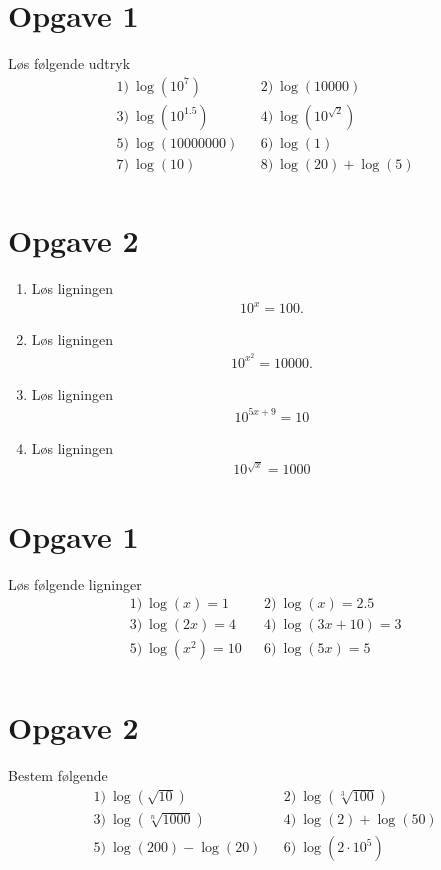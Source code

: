 \section*{Opgave 1}
Løs følgende udtryk
\begin{align*}
	&1) \ \log(10^7)    &&2) \ \log(10000)   \\  
	&3) \ \log(10^{1.5})   &&4) \ \log(10^{\sqrt{2}})     \\  
	&5) \ \log(10000000)   &&6) \ \log(1)   \\  
	&7) \  \log(10)  &&8) \ \log(20)+ \log(5)   \\   
\end{align*}

\section*{Opgave 2}
\begin{enumerate}[label=\roman*)]
	\item Løs ligningen
	\begin{align*}
		10^x = 100.
	\end{align*}
	\item Løs ligningen 
	\begin{align*}
		10^{x^2} = 10000.
	\end{align*}
	\item Løs ligningen 
	\begin{align*}
		10^{5x+9} = 10
	\end{align*}
	\item Løs ligningen 
	\begin{align*}
		10^{\sqrt{x}} = 1000
	\end{align*}
\end{enumerate}

\section*{Opgave 1}
Løs følgende ligninger
\begin{align*}
&1) \  \log(x) = 1  &&2) \ \log(x) = 2.5    \\
&3) \ \log(2x) = 4   &&4) \ \log(3x+10)=3    \\
&5) \ \log(x^2) = 10   &&6) \  \log(5x) = 5    \\
\end{align*}
\section*{Opgave 2}
Bestem følgende 
\begin{align*}
&1) \ \log(\sqrt{10})    &&2) \  \log(\sqrt[3]{100})  \\
&3) \ \log(\sqrt[n]{1000})   &&4) \ \log(2) + \log(50)    \\
&5) \ \log(200)-\log(20)   &&6) \ \log(2\cdot 10^5)   
\end{align*}

